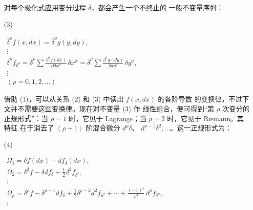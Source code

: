 \documentclass[11pt]{article}
\providecommand{\bdelta}{\bar{\delta}}
\providecommand{\srcnumdisplay}[3][3.4em]{%
  \par\smallskip\noindent
  \begin{minipage}[t]{#1}\vspace*{0pt}#2\end{minipage}%
  \begin{minipage}[t]{\dimexpr\linewidth-#1\relax}\vspace*{0pt}\centering
  \(\displaystyle #3\)
  \end{minipage}\par\smallskip}
\begin{document}
对每个极化式应用变分过程 \(\bdelta\)，都会产生一个不终止的
一般不变量序列：
\srcnumdisplay{(3)}{%
\begin{gathered}
\bdelta^\rho f(x,dx)=\bdelta^\rho g(y,dy),\\
\vdots\\
\bdelta^\rho f_{\delta^\sigma}
=\bdelta^\rho\sum\frac{\partial^\sigma f(dx)}{\partial dx^\sigma}\,
\delta x^\sigma
=\bdelta^\rho\sum\frac{\partial^\sigma g(dy)}{\partial dy^\sigma}\,
\delta y^\sigma,\\
\vdots\\[0.2em]
(\rho=0,1,2,\ldots)
\end{gathered}
}
借助 (1)，可以从关系 (2) 和 (3) 中读出 \(f(x,dx)\) 的各阶导数
的变换律，不过下文并不需要这些变换律。现在对不变量 (3) 作
线性组合，便可得到“第 \(\rho\) 次变分的正规形式”：当 \(\rho=1\)
时，它见于 Lagrange；当 \(\rho=2\) 时，它见于 Riemann。其特征
在于消去了 \((\rho+1)\) 阶混合微分 \(d^\rho\delta\)、
\(d^{\rho-1}\delta^2,\ldots\)。这一正规形式为：
\srcnumdisplay{(4)}{%
\begin{gathered}
\Omega_1=\delta f(dx)-d f_\delta(dx),\\
\Omega_2=\delta^2 f-\delta d f_\delta+\frac12 d^2 f_{\delta^2},\\
\vdots\\
\Omega_\rho=\delta^\rho f-\delta^{\rho-1}d f_\delta
+\frac12\delta^{\rho-2}d^2 f_{\delta^2}
+\cdots+\frac{(-1)^\rho}{\rho!}\,d^\rho f_{\delta^\rho},\\
\vdots
\end{gathered}
}
\end{document}
